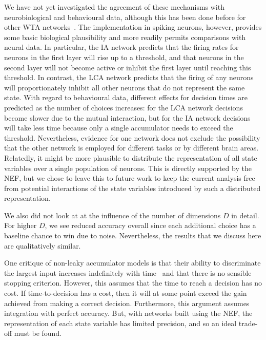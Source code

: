 \documentclass[10pt,letterpaper]{article}
\begin{document}
We have not yet investigated the agreement of these mechanisms with neurobiological and behavioural data, although this has been done before for other WTA networks~\cite{gold2007,smith2004}.
The implementation in spiking neurons, however, provides some basic biological plausibility and more readily permits comparisons with neural data.
In particular, the IA network predicts that the firing rates for neurons in the first layer will rise up to a threshold, and that neurons in the second layer will not become active or inhibit the first layer until reaching this threshold.
In contrast, the LCA network predicts that the firing of any neurons will proportionately inhibit all other neurons that do not represent the same state.
With regard to behavioural data, different effects for decision times are predicted as the number of choices increases:
for the LCA network decisions become slower due to the mutual interaction, but for the IA network decisions will take less time because only a single accumulator needs to exceed the threshold.
Nevertheless, evidence for one network does not exclude the possibility that the other network is employed for different tasks or by different brain areas.
Relatedly, it might be more plausible to distribute the representation of all state variables over a single population of neurons.
This is directly supported by the NEF, but we chose to leave this to future work to keep the current analysis free from potential interactions of the state variables introduced by such a distributed representation.

We also did not look at at the influence of the number of dimensions $D$ in detail.
For higher $D$, we see reduced accuracy overall since each additional choice has a baseline chance to win due to noise.
Nevertheless, the results that we discuss here are qualitatively similar.

One critique of non-leaky accumulator models is that their ability to discriminate the largest input increases indefinitely with time~\cite{usher2001} and that there is no sensible stopping criterion.
However, this assumes that the time to reach a decision has no cost.
If time-to-decision has a cost, then it will at some point exceed the gain achieved from making a correct decision.
Furthermore, this argument assumes integration with perfect accuracy.
But, with networks built using the NEF, the representation of each state variable has limited precision, and so an ideal trade-off must be found.
\end{document}
